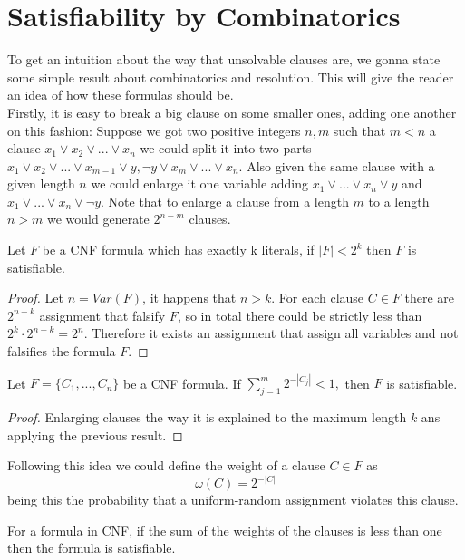 \section{Satisfiability by Combinatorics}


To get an intuition about the way that unsolvable clauses are, we gonna state some simple result about combinatorics and resolution. This will give the reader an idea of how these formulas should be. \\

Firstly, it is easy to break a big clause on some smaller ones, adding one another on this fashion: Suppose we got two positive integers $n,m$ such that $m < n$ a clause $x_1\vee x_2 \vee ... \vee x_n$ we could split it into two parts $x_1\vee x_2  \vee ... \vee x_{m-1} \vee y, \neg y \vee x_m \vee ... \vee x_n$. Also given the same clause with a given length $n$ we could enlarge it one variable adding $ x_1 \vee ... \vee x_n \vee y$ and $ x_1 \vee ... \vee x_n \vee \neg y$. Note that to enlarge a clause from a length $m$ to a length $n>m$ we would generate $2^{n-m}$ clauses.


\begin{proposition}
	Let $F$ be a CNF formula which has exactly k literals, if $|F| < 2^k$ then $F$ is satisfiable.
\end{proposition}
\begin{proof}
	Let $n = Var(F)$, it happens that $n > k$. For each clause $C \in F$ there are $2^{n-k}$ assignment that falsify $F$, so in total there could be strictly less than $2^k \cdot 2^{n-k} = 2^n.$ Therefore it exists an assignment that assign all variables and not falsifies the formula $F$.
\end{proof}
\begin{proposition}
	Let $F=\{C_1,...,C_n\}$ be a CNF formula. If $\sum_{j=1}^m 2^{-|C_j|}<1,$ then $F$ is satisfiable.
\end{proposition}
\begin{proof}
	Enlarging clauses the way it is explained to the maximum length $k$ ans applying the previous result.
\end{proof}

Following this idea we could define the weight of a clause $C\in F$ as $$\omega(C) = 2^{-|C|} $$
being this the probability that a uniform-random assignment violates this clause. 

\begin{corollary}
	For a formula in CNF, if the sum of the weights of the clauses is less than one then the formula is satisfiable.
\end{corollary}


